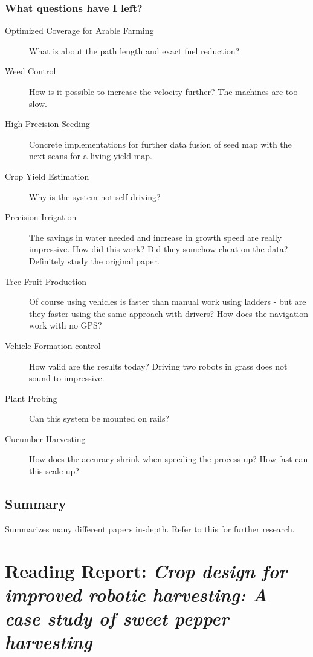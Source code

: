     \subsubsection*{What questions have I left?}
    \begin{description}
    
        \item[Optimized Coverage for Arable Farming] What is about the path length and exact fuel reduction?
        \item[Weed Control] How is it possible to increase the velocity further? The machines are too slow.
        \item[High Precision Seeding] Concrete implementations for further data fusion of seed map with the next scans for a living yield map.
        \item[Crop Yield Estimation] Why is the system not self driving?
        \item[Precision Irrigation] The savings in water needed and increase in growth speed are really impressive. How did this work? Did they somehow cheat on the data?
        Definitely study the original paper. 
        \item[Tree Fruit Production] Of course using vehicles is faster than manual work using ladders - but are they faster using the same approach with drivers? How does the navigation work with no GPS?
        \item[Vehicle Formation control] How valid are the results today? Driving two robots in grass does not sound to impressive.
        \item[Plant Probing] Can this system be mounted on rails?
        \item[Cucumber Harvesting] How does the accuracy shrink when speeding the process up? How fast can this scale up? 
    
    \end{description} 
    
    
    \subsection*{Summary} 
    Summarizes many different papers in-depth. Refer to this for further research.
    

    \newpage
    \section{Reading Report: \emph{Crop design for improved robotic harvesting: A case study of sweet pepper harvesting}}
    \label{sec:Herck2020}
    \cite{Herck2020}
    
